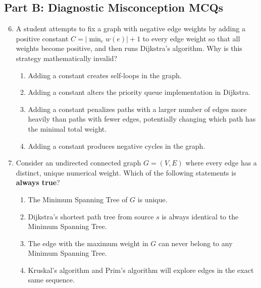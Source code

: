 \subsection*{Part B: Diagnostic Misconception MCQs}

\begin{enumerate}
    \setcounter{enumi}{5}
    \item A student attempts to fix a graph with negative edge weights by adding a positive constant $C = |\min_{e} w(e)| + 1$ to every edge weight so that all weights become positive, and then runs Dijkstra's algorithm. Why is this strategy mathematically invalid?
    \begin{enumerate}
        \item Adding a constant creates self-loops in the graph.
        \item Adding a constant alters the priority queue implementation in Dijkstra.
        \item Adding a constant penalizes paths with a larger number of edges more heavily than paths with fewer edges, potentially changing which path has the minimal total weight.
        \item Adding a constant produces negative cycles in the graph.
    \end{enumerate}

    \item Consider an undirected connected graph $G = (V, E)$ where every edge has a distinct, unique numerical weight. Which of the following statements is \textbf{always true}?
    \begin{enumerate}
        \item The Minimum Spanning Tree of $G$ is unique.
        \item Dijkstra's shortest path tree from source $s$ is always identical to the Minimum Spanning Tree.
        \item The edge with the maximum weight in $G$ can never belong to any Minimum Spanning Tree.
        \item Kruskal's algorithm and Prim's algorithm will explore edges in the exact same sequence.
    \end{enumerate}
\end{enumerate}
